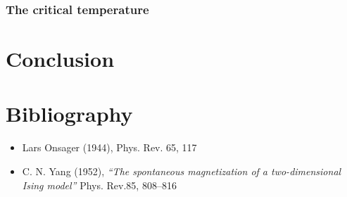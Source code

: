 \documentclass[a4paper, twoside, 11pt]{report}
\theoremstyle{theorem}
\theoremstyle{remark}
\theoremstyle{exemple}
\begin{document}
        \newpage
        \subsection{The critical temperature}



\chapter*{Conclusion}

    \paragraph{}
    

\chapter*{Bibliography}
    
    \begin{itemize}
        \item Lars Onsager (1944), Phys. Rev. 65, 117
        \item C. N. Yang (1952), \textit{“The spontaneous magnetization of a two-dimensional Ising model”} Phys. Rev.85, 808–816
    \end{itemize}
    
\end{document}
